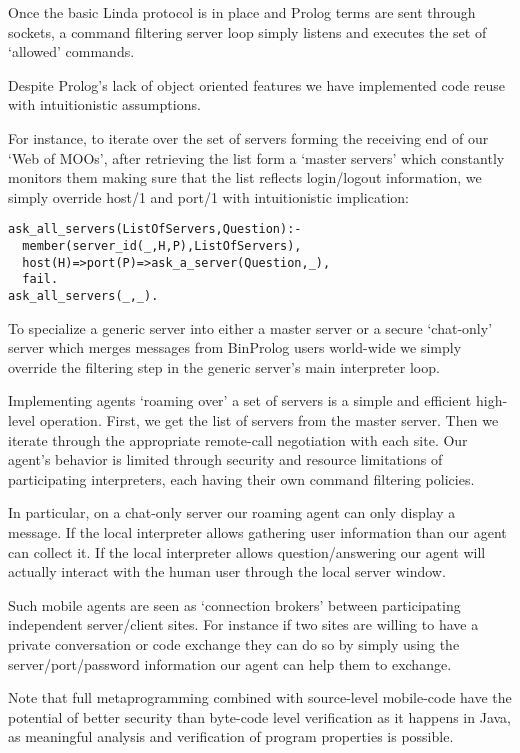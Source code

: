 \documentclass{article}
\begin{document}
Once the basic Linda protocol is in place and Prolog terms
are sent through sockets, a command filtering server loop
simply listens and executes the set of `allowed' commands.

Despite Prolog's lack of object oriented features we have implemented
code reuse with intuitionistic assumptions.

For instance, to iterate over the set of servers forming
the receiving end of our `Web of MOOs', after retrieving
the list form a `master servers' which constantly monitors
them making sure that the list reflects login/logout
information, we simply override host/1 and port/1 with
intuitionistic implication:

\begin{verbatim}
ask_all_servers(ListOfServers,Question):-
  member(server_id(_,H,P),ListOfServers),
  host(H)=>port(P)=>ask_a_server(Question,_),
  fail.
ask_all_servers(_,_).
\end{verbatim}

To specialize a generic server into either a master server or a
secure `chat-only' server which merges messages from BinProlog
users world-wide we simply override the filtering step in the 
generic server's main interpreter loop.

Implementing agents `roaming over' a set of
servers is a simple and efficient high-level operation.
First, we get the list of servers from the master server.
Then we iterate through the appropriate remote-call negotiation
with each site. Our agent's behavior is limited through
security and resource limitations of participating interpreters,
each having their own command filtering policies.

In particular, on a chat-only server our roaming agent can only
display a message. If the local interpreter allows gathering
user information than our agent can collect it. If the local
interpreter allows question/answering our agent will actually
interact with the human user through the local server window.

Such mobile agents are seen as `connection brokers' between participating
independent server/client sites. For instance if two sites are
willing to have a private conversation or code exchange they can
do so by simply using the server/port/password information our
agent can help them to exchange.

Note that full metaprogramming combined with source-level mobile-code
have the potential of better security than byte-code level verification
as it happens in Java, as meaningful analysis and verification of
program properties is possible.
\end{document}
